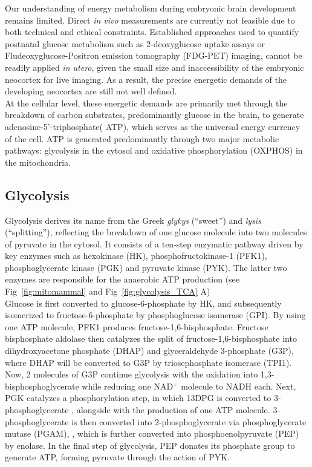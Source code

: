 Our understanding of energy metabolism during embryonic brain development remains limited. Direct \textit{in vivo}  measurements are currently not feasible due to both technical and ethical constraints. Established approaches used to quantify postnatal glucose metabolism such as 2-deoxyglucose uptake assays or Fludeoxyglucose-Positron emission tomography (\gls{FDG-PET}) imaging, cannot
be readily applied \textit{in utero}, given the small size and inaccessibility of the embryonic neocortex for live imaging. As a result, the precise energetic demands of the developing neocortex are still not well defined.
\\

At the cellular level, these energetic demands are primarily met through the breakdown of carbon substrates, predominantly glucose in the brain, to generate adenosine-5’-triphosphate( \gls{ATP}),  which serves as the universal energy currency of the cell. ATP is generated predominantly through two major metabolic pathways: glycolysis in the cytosol and oxidative phosphorylation (\gls{OXPHOS}) in the mitochondria.

\subsection{Glycolysis}
Glycolysis derives its name from the Greek \textit{glykys} (“sweet”) and \textit{lysis} 
(“splitting”), reflecting the breakdown of one glucose molecule into two molecules of pyruvate in the cytosol. It consists of a ten-step enzymatic pathway driven by key enzymes such as hexokinase (\gls{HK}), 
phosphofructokinase-1 (\gls{PFK1}), phosphoglycerate kinase (\gls{PGK}) and pyruvate kinase (\gls{PYK}). The latter two enzymes are responsible for the anaerobic ATP production (see Fig~\ref{fig:mitomammal} and Fig~\ref{fig:glycolysis_TCA} A)
\\

Glucose is first converted to glucose-6-phosphate by HK, and subsequently isomerized to fructose-6-phosphate by phosphoglucose isomerase (\gls{GPI}).
By using one ATP molecule, PFK1 produces fructose-1,6-bisphosphate. Fructose bisphosphate aldolase then catalyzes the split of fructose-1,6-bisphosphate into dihydroxyacetone phosphate (\gls{DHAP})
and glyceraldehyde 3-phosphate (\gls{G3P}), where DHAP will be converted to G3P by triosephosphate isomerase (\gls{TPI1}).
Now, 2 molecules of G3P continue glycolysis with the oxidation into 1,3-bisphosphoglycerate while reducing one NAD$^+$ molecule to NADH each. Next, PGK catalyzes a phosphorylation step, in which 13DPG is converted to 3-phosphoglycerate , alongside with the production of one ATP molecule. 3-phosphoglycerate is then converted into 2-phosphoglycerate via phosphoglycerate mutase (\gls{PGAM}),
, which is further converted into phosphoenolpyruvate (\gls{PEP}) by enolase. In the final step of glycolysis, PEP donates its phosphate group to generate ATP, forming pyruvate through the action of PYK. 
\\

